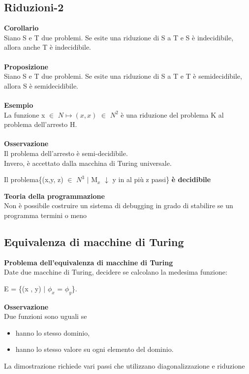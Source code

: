 \subsection{Riduzioni-2}
\textbf{Corollario}\\
Siano S e T due problemi. Se esite una riduzione di S a T e S è indecidibile, allora anche T è indecidibile.\\\\
\textbf{Proposizione}\\
Siano S e T due problemi. Se esite una riduzione di S a T e T è semidecidibile, allora S è semidecidibile.\\\\
\textbf{Esempio}\\
La funzione x $\in$ $N \mapsto (x,x)$ $\in$ $N^2$ è una riduzione del problema K al problema dell’arresto H.\\\\
\textbf{Osservazione}\\
Il problema dell’arresto è semi-decidibile.\\
Invero, è accettato dalla macchina di Turing universale.\\
\begin{center}
    Il problema\{(x,y, z) $\in$ $N^3$ $|$ M$_x$ $\downarrow$ y in al più z passi\}  \textbf{è decidibile}
\end{center}
\textbf{Teoria della programmazione}\\
Non è possibile costruire un sistema di debugging in grado di stabilire se un
programma termini o meno
\newpage
\subsection{Equivalenza di macchine di Turing}
\textbf{Problema dell’equivalenza di macchine di Turing}\\
Date due macchine di Turing, decidere se calcolano la medesima funzione:
\begin{center}
    E = \{(x , y) $|$ $\phi_x$ = $\phi_y$\}.
\end{center}
\textbf{Osservazione}\\
Due funzioni sono uguali se
\begin{itemize}
    \item hanno lo stesso dominio,
    
    \item hanno lo stesso valore su ogni elemento del dominio.
\end{itemize}
La dimostrazione richiede vari passi che utilizzano diagonalizzazione e riduzione
\newpage
